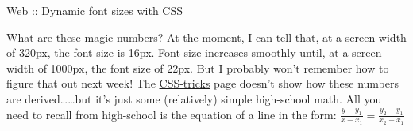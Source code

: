 \documentclass[8pt,xcolor={svgnames, x11names}]{beamer}
\begin{document}
\begin{frame}{Web :: Dynamic font sizes with CSS}
{\begin{itemize}
\begin{center}
		\end{center}
		What are these magic numbers? At the moment, I can tell that, at a screen width of 320px, the font size is 16px. Font size increases smoothly until, at a screen width of 1000px, the font size of 22px. But I probably won't remember how to figure that out next week! The \href{https://css-tricks.com/snippets/css/fluid-typography/}{CSS-tricks} page doesn't show how these numbers are derived\ldots \pars \ldots but it's just some (relatively) simple high-school math. All you need to recall from high-school is the equation of a line in the form: $\frac{y-y_1}{x-x_1}=\frac{y_2-y_1}{x_2-x_1}$
	\end{itemize}
	}
\end{frame}
\end{document}
